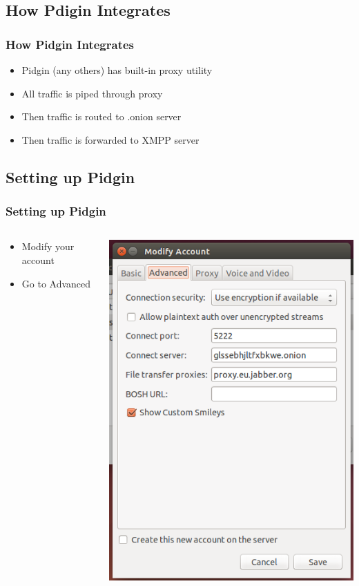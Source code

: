 \documentclass{beamer}
\begin{document}
\subsection{How Pdigin Integrates}
\begin{frame}
\frametitle{How Pidgin Integrates}
\begin{itemize}
\item Pidgin (any others) has built-in proxy utility
\item All traffic is piped through proxy
\item Then traffic is routed to .onion server
\item Then traffic is forwarded to XMPP server
\end{itemize}
\end{frame}
\subsection{Setting up Pidgin}
\begin{frame}
\frametitle{Setting up Pidgin}
\begin{columns}
    \begin{column}{0.48\textwidth}
        \begin{itemize}
          \item Modify your account
          \item Go to Advanced
        \end{itemize}
    \end{column}
    \begin{column}{.5\textwidth}
        \includegraphics[width=.9\linewidth]{pidgin_advanced}
    \end{column}
\end{columns}
\end{frame}
\end{document}
